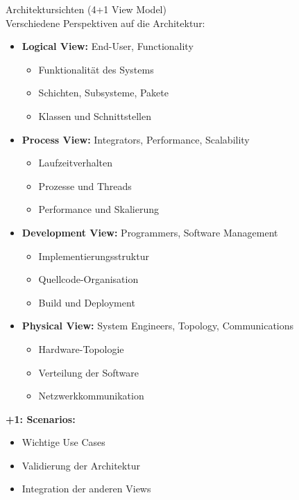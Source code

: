 \begin{concept}{Architektursichten (4+1 View Model)}\\
Verschiedene Perspektiven auf die Architektur:

\begin{itemize}
    \item \textbf{Logical View:} End-User, Functionality
    \begin{itemize}
        \item Funktionalität des Systems
        \item Schichten, Subsysteme, Pakete
        \item Klassen und Schnittstellen
    \end{itemize}
    
    \item \textbf{Process View:} Integrators, Performance, Scalability
    \begin{itemize}
        \item Laufzeitverhalten
        \item Prozesse und Threads
        \item Performance und Skalierung
    \end{itemize}

    \item \textbf{Development View:} Programmers, Software Management
    \begin{itemize}
        \item Implementierungsstruktur
        \item Quellcode-Organisation
        \item Build und Deployment
    \end{itemize}
    
    \item \textbf{Physical View:} System Engineers, Topology, Communications
    \begin{itemize}
        \item Hardware-Topologie
        \item Verteilung der Software
        \item Netzwerkkommunikation
    \end{itemize}
\end{itemize}
    
\textbf{+1: Scenarios:}
    \begin{itemize}
        \item Wichtige Use Cases
        \item Validierung der Architektur
        \item Integration der anderen Views
    \end{itemize}


\end{concept}
